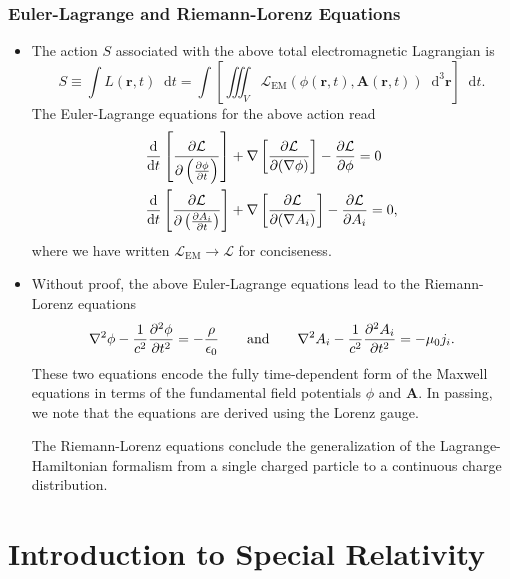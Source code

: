 \documentclass[11pt, a4paper]{article}
\newcommand{\diff}{\mathop{}\!\mathrm{d}} %
\newcommand{\dr}{\diff^{3} \r}  %
\newcommand{\eqtext}[1]{\qquad \text{#1} \qquad}
\renewcommand{\L}{\mathcal{L}}  %
\renewcommand{\vec}[1]{\bm{#1}} %
\renewcommand{\r}{\vec{r}}
\newcommand{\A}{\vec{A}} %
\newcommand{\ee}{\epsilon_{0}}  %
\newcommand{\mm}{\mu_{0}}  %
\renewcommand{\grad}{\nabla}
\renewcommand{\laplacian}{\nabla^{2}}
\begin{document}
\subsubsection{Euler-Lagrange and Riemann-Lorenz Equations}
\begin{itemize}
	\item The action $ S $ associated with the above total electromagnetic Lagrangian is 
	\begin{equation*}
        S \equiv \int L(\r, t) \diff t = \int \left[ \iiint_{V} \L_{\text{EM}}(\phi(\r, t), \A(\r, t))\dr \right] \diff t.
	\end{equation*}
	The Euler-Lagrange equations for the above action read
	\begin{align*}
		&\dv{t}\left[\pdv{\L}{\left(\pdv{\phi}{t}\right)}\right] + \grad \left[\pdv{\L}{(\grad \phi)}\right] - \pdv{\L}{\phi} = 0\\
		& \dv{t} \left[\pdv{\L}{\left(\pdv{A_{i}}{t}\right)}\right] + \grad \left[\pdv{\L}{(\grad A_{i})}\right] - \pdv{\L}{A_{i}} = 0,
	\end{align*}
    where we have written $ \L_{\text{EM}} \to \L $ for conciseness. 
	
	\item Without proof, the above Euler-Lagrange equations lead to the Riemann-Lorenz equations
	\begin{align*}
		\laplacian \phi - \frac{1}{c^{2}}\pdv[2]{\phi}{t} = -\frac{\rho}{\ee} \eqtext{and} \laplacian A_{i} - \frac{1}{c^{2}} \pdv[2]{A_{i}}{t} = - \mm j_{i}.
	\end{align*}
	These two equations encode the fully time-dependent form of the Maxwell equations in terms of the fundamental field potentials $ \phi $ and $ \A $. In passing, we note that the equations are derived using the Lorenz gauge.
	
	The Riemann-Lorenz equations conclude the generalization of the Lagrange-Hamiltonian formalism from a single charged particle to a continuous charge distribution.
\end{itemize}

\newpage

\section{Introduction to Special Relativity}
\end{document}
